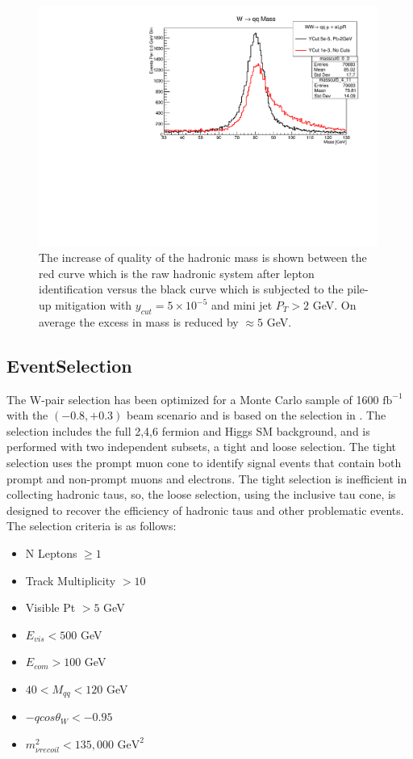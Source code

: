 \begin{figure}
\begin{minipage}{0.49\textwidth}
        \includegraphics[width=0.99\textwidth]{SupMass.pdf} %
        \caption{The increase of quality of the hadronic mass is shown between the red curve which is the raw hadronic system after lepton identification versus the black curve which is subjected to the pile-up mitigation with $y_{cut} = 5\times10^{-5}$ and mini jet $P_T > 2$ GeV. On average the excess in mass is reduced by $\approx 5$ GeV. }
        \label{fig:supmass}
    \end{minipage}
\end{figure}


\subsection{EventSelection}
\label{subsec:EventSelection}
The W-pair selection has been optimized for a Monte Carlo sample of 1600 $\text{fb}^{−1}$ with the $(-0.8,+0.3)$ beam scenario and is based on the selection in \cite{ivan}. The selection includes the full 2,4,6 fermion and Higgs SM background, and is performed with two independent subsets, a tight and loose selection. The tight selection uses the prompt muon cone to identify signal events that contain both prompt and non-prompt muons and electrons. The tight selection is inefficient in collecting hadronic taus, so, the loose selection, using the inclusive tau cone, is designed to recover the efficiency of hadronic taus and other problematic events. The selection criteria is as follows:
\begin{itemize}
\item N Leptons $\geq 1$
\item Track Multiplicity $> 10$  
\item Visible Pt $> 5$ GeV  
\item $E_{vis} < 500$ GeV 
\item $E_{com} > 100$ GeV
\item $40<M_{qq}<120$ GeV
\item  $-qcos\theta_W < -0.95$
\item  $m^2_{\nu recoil} < 135,000 \, \, \text{GeV}^2$
\end{itemize}


